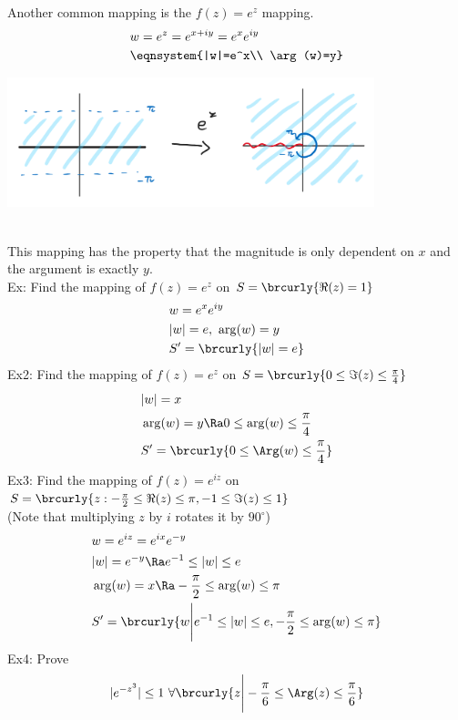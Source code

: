 Another common mapping is the $f(z)=e^z$ mapping.
\begin{align*}
    &w=e^z=e^{x+iy}=e^xe^{iy}\\
    &\eqnsystem{|w|=e^x\\ \arg(w)=y}
\end{align*}
\centerline{\includegraphics[width=0.8\textwidth]{Images/ComplexAnalysisPictures/ExponentialMapping.png}}\\
This mapping has the property that the magnitude is only dependent on $x$ and the argument is exactly $y$.\\
Ex: Find the mapping of $f(z)=e^z$ on $S=\brcurly{\Re(z)=1}$
\begin{align*}
    &w=e^xe^{iy}\\
    &|w|=e,\ \arg(w)=y\\
    &S'=\brcurly{|w|=e}
\end{align*}
Ex2: Find the mapping of $f(z)=e^z$ on $S=\brcurly{0\leq \Im(z)\leq\frac{\pi}{4}}$
\begin{align*}
    &|w|=x\\
    &\arg(w)=y\Ra 0\leq \arg(w)\leq \frac{\pi}{4}\\
    &S'=\brcurly{0\leq \Arg(w)\leq \frac{\pi}{4}}
\end{align*}
Ex3: Find the mapping of $f(z)=e^{iz}$ on $S=\brcurly{z: -\frac{\pi}{2}\leq \Re(z)\leq \pi,-1\leq\Im(z)\leq1}$\\
(Note that multiplying $z$ by $i$ rotates it by $90^\circ$)
\begin{align*}
    &w=e^{iz}=e^{ix}e^{-y}\\
    &|w|=e^{-y}\Ra e^{-1}\leq|w|\leq e\\
    &\arg(w)=x\Ra -\frac{\pi}{2}\leq \arg(w)\leq\pi\\
    &S'=\brcurly{w\Bigg\vert e^{-1}\leq|w|\leq e,-\frac{\pi}{2}\leq \arg(w)\leq\pi}
\end{align*}
Ex4: Prove 
\[ |e^{-z^3}|\leq 1\ \forall \brcurly{z\Bigg\vert-\frac{\pi}{6}\leq\Arg(z)\leq\frac{\pi}{6}} \]

